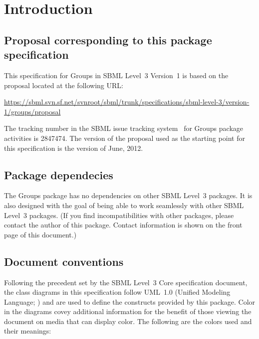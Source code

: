 
\section{Introduction}
\label{intro}
 





\subsection{Proposal corresponding to this package specification}

This specification for Groups in SBML Level~3 Version~1 is based on the proposal located at the following URL:

\begin{center}
  \vspace*{1ex}\small
  \url{https://sbml.svn.sf.net/svnroot/sbml/trunk/specifications/sbml-level-3/version-1/groups/proposal}
  \vspace*{1ex}
\end{center}

The tracking number in the SBML issue tracking system~\citep{tracker} for Groups package activities is 2847474.  The version of the proposal used as the starting point for this specification is the version of June, 2012.


\subsection{Package dependecies}

The Groups package has no dependencies on other SBML Level~3 packages.  It is also designed with the goal of being able to work seamlessly with other SBML Level~3 packages.  (If you find incompatibilities with other packages, please contact the author of this package.  Contact information is shown on the front page of this document.)


\subsection{Document conventions}
\label{conventions}

Following the precedent set by the SBML Level~3 Core specification document, the class diagrams in this specification follow UML~1.0 (Unified Modeling Language; \citealt{eriksson:1998,oestereich:1999}) and are used to define the constructs provided by this package.  Color in the diagrams covey additional information for the benefit of those viewing the document on media that can display color.  The following are the colors used and their meanings:

